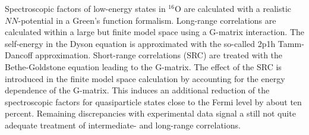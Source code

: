 \begin{WTabstract}%
Spectroscopic factors of low-energy states in $^{16}$O are calculated with a 
realistic $NN$-potential in a Green's function formalism. 
Long-range correlations are calculated within a large but
finite model space using a
G-matrix interaction. The self-energy in the Dyson equation is approximated
with the so-called 2p1h Tamm-Dancoff approximation. Short-range correlations
(SRC)
are treated with the Bethe-Goldstone equation leading to the G-matrix. The
effect of the SRC is introduced in the finite model space calculation by 
accounting for the energy dependence of the G-matrix.
This induces an additional
 reduction of the spectroscopic factors for quasiparticle states 
close to the Fermi level by about ten percent. Remaining discrepancies with 
experimental data signal a still not quite adequate treatment of 
intermediate- and long-range correlations.
\end{WTabstract}
